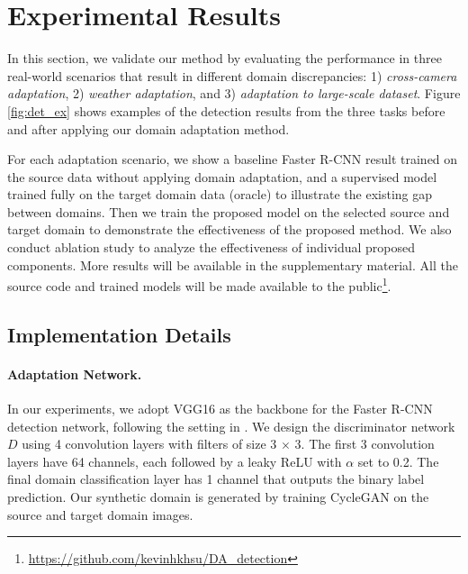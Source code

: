 \documentclass[10pt,twocolumn,letterpaper]{article}
\begin{document}
\section{Experimental Results} \label{experiments}
In this section, we validate our method by evaluating the performance in three real-world scenarios that result in different domain discrepancies:
1) \textit{cross-camera adaptation},
2) \textit{weather adaptation},
and 3) \textit{adaptation to large-scale dataset}.
Figure \ref{fig:det_ex} shows examples of the detection results from the three tasks before and after applying our domain adaptation method.

For each adaptation scenario, we show a baseline Faster R-CNN result trained on the source data without applying domain adaptation, and a supervised model trained fully on the target domain data (oracle) to illustrate the existing gap between domains.
Then we train the proposed model on the selected source and target domain to demonstrate the effectiveness of the proposed method.
We also conduct ablation study to analyze the effectiveness of individual proposed components.
More results will be available in the supplementary material.
All the source code and trained models will be made available to the public\footnote{\url{https://github.com/kevinhkhsu/DA_detection}}.

\subsection{Implementation Details}
\paragraph{Adaptation Network.} 
In our experiments, we adopt VGG16 \cite{Simonyan14c} as the backbone for the Faster R-CNN \cite{Ren_2017} detection network, following the setting in \cite{chen2018domain}.
We design the discriminator network $D$ using 4 convolution layers with filters of size 3 $\times$ 3. 
The first 3 convolution layers have 64 channels, each followed by a leaky ReLU \cite{maas2013rectifier} with $\alpha$ set to 0.2.
The final domain classification layer has 1 channel that outputs the binary label prediction.
Our synthetic domain is generated by training CycleGAN \cite{CycleGAN2017} on the source and target domain images.
\end{document}
